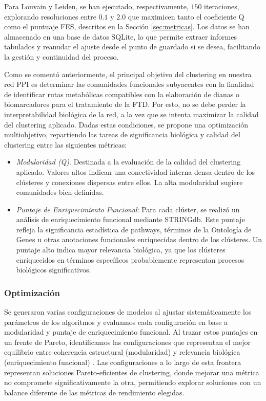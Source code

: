 Para Louvain y Leiden, se han ejecutado, respectivamente, \(150\) iteraciones, explorando resoluciones entre \(0.1\) y \(2.0\) que maximicen tanto el coeficiente Q como el puntuaje FES, descritos en la Sección \ref{sec:metricas}. Los datos se han almacenado en una base de datos SQLite, lo que permite extraer informes tabulados y reanudar el ajuste desde el punto de guardado si se desea, facilitando la gestión y continuidad del proceso.


Como se comentó anteriormente, el principal objetivo del clustering en nuestra red PPI es determinar las comunidades funcionales subyacentes con la finalidad de identificar rutas metabólicas compatibles con la elaboración de dianas o biomarcadores para el tratamiento de la FTD. Por esto, no se debe perder la interpretabilidad biológica de la red, a la vez que se intenta maximizar la calidad del clustering aplicado. Dadas estas condiciones, se propone una optimización multiobjetivo, repartiendo las tareas de significancia biológica y calidad del clustering entre las siguientes métricas:

\begin{itemize}
	\item \textit{Modularidad (Q)}. Destinada a la evaluación de la calidad del clustering aplicado. Valores altos indican una conectividad interna densa dentro de los clústeres y conexiones dispersas entre ellos. La alta modularidad sugiere comunidades bien definidas.
	
	\item \textit{Puntaje de Enriquecimiento Funcional}: Para cada clúster, se realizó un análisis de enriquecimiento funcional mediante STRINGdb. Este puntaje refleja la significancia estadística de pathways, términos de la Ontología de Genes u otras anotaciones funcionales enriquecidas dentro de los clústeres. Un puntaje alto indica mayor relevancia biológica, ya que los clústeres enriquecidos en términos específicos probablemente representan procesos biológicos significativos.
\end{itemize}


\subsubsection*{Optimización}
Se generaron varias configuraciones de modelos al ajustar sistemáticamente los parámetros de los algoritmos y evaluamos cada configuración en base a modularidad y puntaje de enriquecimiento funcional. Al trazar estos puntajes en un frente de Pareto, identificamos las configuraciones que representan el mejor equilibrio entre coherencia estructural (modularidad) y relevancia biológica (enriquecimiento funcional) \cite{goodarzi2014PARETOFRONT1,jahan2013multiPARETOFRONT2,costa2015paretoPARETOFRONT3}. Las configuraciones a lo largo de esta frontera representan soluciones Pareto-eficientes de clustering, donde mejorar una métrica no compromete significativamente la otra, permitiendo explorar soluciones con un balance diferente de las métricas de rendimiento elegidas.

